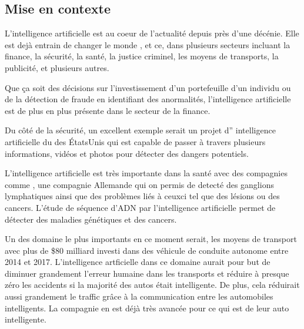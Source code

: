 \documentclass[letterpaper,10pt,french]{sphinxmanual}
\begin{document}
\subsection{Mise en contexte}
\label{\detokenize{enonce_sujet:mise-en-contexte}}
L’intelligence artificielle est au coeur de l’actualité depuis près d’une
décénie. Elle est dejà entrain de changer le monde , et ce, dans plusieurs
secteurs incluant la finance, la sécurité, la santé, la justice criminel,
les moyens de transports, la publicité, et plusieurs autres.

Que ça soit des décisions sur l’investissement d’un portefeuille
d’un individu ou de la détection de fraude en identifiant des anormalités, l’intelligence
artificielle est de plus en plus présente dans le secteur de la finance.

Du côté de la
sécurité, un excellent exemple serait 
un projet d” intelligence artificielle du 
des États\sphinxhyphen{}Unis qui est capable de passer à travers plusieurs informations,
vidéos et photos pour détecter des dangers potentiels.

L’intelligence artificielle est très importante dans la santé avec des compagnies comme
, une compagnie Allemande qui on permis de detecté
des ganglions lymphatiques ainsi que des problèmes liés à ceux\sphinxhyphen{}ci tel que des lésions
ou des cancers. L’étude de séquence d’ADN par l’intelligence artificielle permet de détecter
des maladies génétiques et des cancers.

Un des domaine le plus importants en ce moment serait, les moyens de transport avec plus de \$80
milliard investi dans des véhicule de conduite autonome entre 2014 et 2017. L’intelligence
artficielle dans ce domaine aurait pour but de diminuer grandement l’erreur humaine dans les transports
et réduire à presque zéro les accidents si la majorité des autos était intelligente. De plus, cela réduirait
aussi grandement le traffic grâce à la communication entre les automobiles intelligents. La compagnie 
en est déjà très avancée pour ce qui est de leur auto intelligente.
\end{document}

